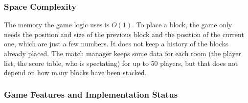 \documentclass[12pt,letterpaper]{article}
\begin{document}
\subsubsection{Space Complexity}

The memory the game logic uses is $O(1)$. To place a block, the game only needs the position and size of the previous block and the position of the current one, which are just a few numbers. It does not keep a history of the blocks already placed. The match manager keeps some data for each room (the player list, the score table, who is spectating) for up to 50 players, but that does not depend on how many blocks have been stacked.

\subsubsection{Game Features and Implementation Status}
\end{document}
